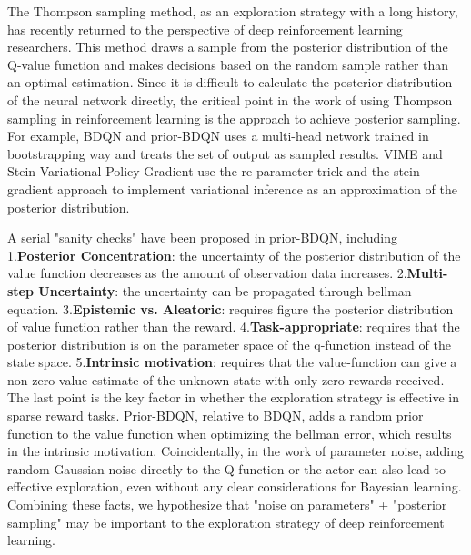 The Thompson sampling method, as an exploration strategy with a long history, has recently returned to the perspective of deep reinforcement learning researchers. This method draws a sample from the posterior distribution of the Q-value function and makes decisions based on the random sample rather than an optimal estimation. Since it is difficult to calculate the posterior distribution of the neural network directly, the critical point in the work of using Thompson sampling in reinforcement learning is the approach to achieve posterior sampling. For example, BDQN \cite{BDQN} and prior-BDQN \cite{osband2018randomized} uses a multi-head network trained in bootstrapping way and treats the set of output as sampled results. VIME \cite{VIME} and Stein Variational Policy Gradient \cite{liu2017stein} use the re-parameter trick and the stein gradient approach to implement variational inference as an approximation of the posterior distribution. 

A serial "sanity checks" have been proposed in prior-BDQN, including 1.\textbf{Posterior Concentration}: the uncertainty of the posterior distribution of the value function decreases as the amount of observation data increases. 2.\textbf{Multi-step Uncertainty}: the uncertainty can be propagated through bellman equation. 3.\textbf{Epistemic vs. Aleatoric}: requires figure the posterior distribution of value function rather than the reward. 4.\textbf{Task-appropriate}: requires that the posterior distribution is on the parameter space of the q-function instead of the state space. 5.\textbf{Intrinsic motivation}: requires that the value-function can give a non-zero value estimate of the unknown state with only zero rewards received. The last point is the key factor in whether the exploration strategy is effective in sparse reward tasks. Prior-BDQN, relative to BDQN, adds a random prior function to the value function when optimizing the bellman error, which results in the intrinsic motivation. Coincidentally, in the work of parameter noise, adding random Gaussian noise directly to the Q-function or the actor can also lead to effective exploration, even without any clear considerations for Bayesian learning. Combining these facts, we hypothesize that "noise on parameters" + "posterior sampling" may be important to the exploration strategy of deep reinforcement learning.